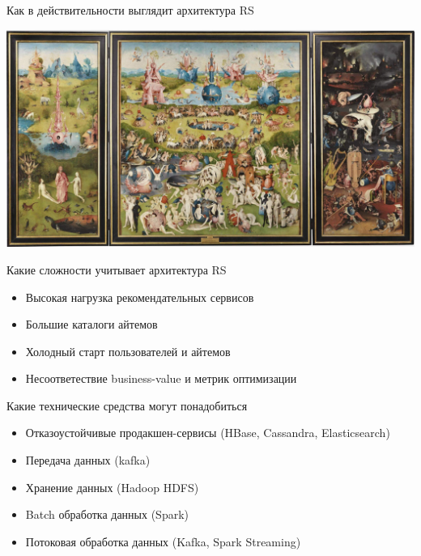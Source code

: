 \documentclass[11pt,aspectratio=169,handout]{beamer}
\begin{document}
\begin{frame}{Как в действительности выглядит архитектура RS}

\begin{center}
\includegraphics[scale=0.15]{images/bosch.jpeg}
\end{center}

\end{frame}

\begin{frame}{Какие сложности учитывает архитектура RS}

\begin{itemize}
\item Высокая нагрузка рекомендательных сервисов
\item Большие каталоги айтемов
\item Холодный старт пользователей и айтемов
\item Несоответествие business-value и метрик оптимизации
\end{itemize}

\end{frame}

\begin{frame}{Какие технические средства могут понадобиться}

\begin{itemize}
\item Отказоустойчивые продакшен-сервисы (HBase, Cassandra, Elasticsearch)
\item Передача данных (kafka)
\item Хранение данных (Hadoop HDFS)
\item Batch обработка данных (Spark)
\item Потоковая обработка данных (Kafka, Spark Streaming)
\end{itemize}

\end{frame}
\end{document}
